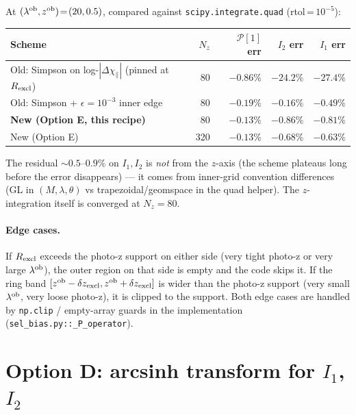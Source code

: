 \documentclass[11pt]{article}
\newcommand{\lob}{\lambda^{\rm ob}}
\newcommand{\zob}{z^{\rm ob}}
\newcommand{\Pop}{\mathcal{P}}
\begin{document}
At \((\lob,\zob)\!=\!(20,0.5)\), compared against
\texttt{scipy.integrate.quad} (rtol\,=\,\(10^{-5}\)):

\vspace{4pt}
\begin{center}
\small
\begin{tabular}{l r r r r}
\toprule
Scheme & \(N_z\) & \(\Pop[1]\) err & \(I_2\) err & \(I_1\) err \\
\midrule
Old: Simpson on log-\(|\Delta\chi_\parallel|\) (pinned at
                                     \(R_{\rm excl}\))    & 80  & \(-0.86\%\) & \(-24.2\%\) & \(-27.4\%\) \\
Old: Simpson + \(\epsilon=10^{-3}\)
                                     inner edge            & 80  & \(-0.19\%\) & \(-0.16\%\) & \(-0.49\%\) \\
\textbf{New (Option E, this recipe)}  & 80  & \(-0.13\%\) & \(-0.86\%\) & \(-0.81\%\) \\
New (Option E)                        & 320 & \(-0.13\%\) & \(-0.68\%\) & \(-0.63\%\) \\
\bottomrule
\end{tabular}
\end{center}

The residual \(\sim 0.5\)--\(0.9\%\) on \(I_1,I_2\) is
\emph{not} from the \(z\)-axis (the scheme plateaus long before
the error disappears) --- it comes from inner-grid convention
differences (GL in \((M,\lambda,\theta)\) vs
trapezoidal/geomspace in the quad helper). The \(z\)-integration
itself is converged at \(N_z\!=\!80\).

\paragraph{Edge cases.}
If \(R_{\rm excl}\) exceeds the photo-z support on either side
(very tight photo-z or very large \(\lob\)), the outer region on
that side is empty and the code skips it. If the ring band
\([\zob-\delta z_{\rm excl},\zob+\delta z_{\rm excl}]\) is wider
than the photo-z support (very small \(\lob\), very loose
photo-z), it is clipped to the support. Both edge cases are
handled by \texttt{np.clip} / empty-array guards in the
implementation (\texttt{sel\_bias.py::\_P\_operator}).

\section{Option D: arcsinh transform for \(I_1\), \(I_2\)}
\label{sec:optionD}
\end{document}
